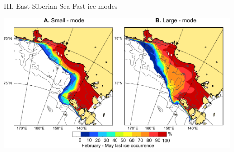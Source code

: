 \documentclass[8pt]{beamer}
\begin{document}
\setwatermark{\fontsize{125pt}{125pt}\selectfont{}}
\begin{frame}[fragile]{III. East Siberian Sea Fast ice modes}
\begin{center}
	\includegraphics[width=0.9\textwidth]{./img/ESS_modes.pdf}
\end{center}
\end{frame}
\end{document}
